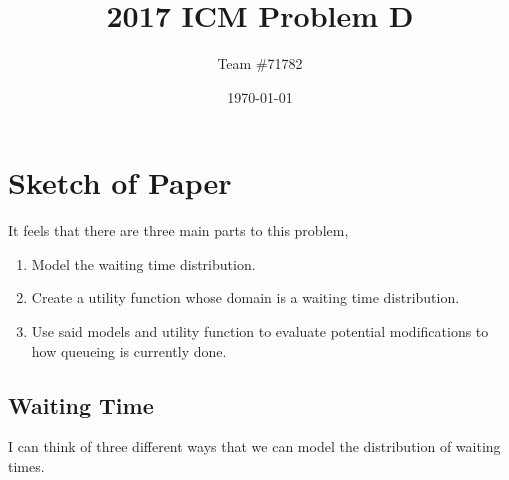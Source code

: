 \documentclass[]{article}
\begin{document}
\title{2017 ICM Problem D}
\author{Team \#71782} %
\date{\today}

\maketitle


\tableofcontents

\newpage

\section{Sketch of Paper}

It feels that there are three main parts to this problem,

\begin{enumerate}

	\item Model the waiting time distribution.
	\item Create a utility function whose domain is a waiting time distribution.
	\item Use said models and utility function to evaluate potential modifications to how queueing is currently done.
	

\end{enumerate}

\subsection{Waiting Time}

I can think of three different ways that we can model the distribution of waiting times. 
\end{document}
